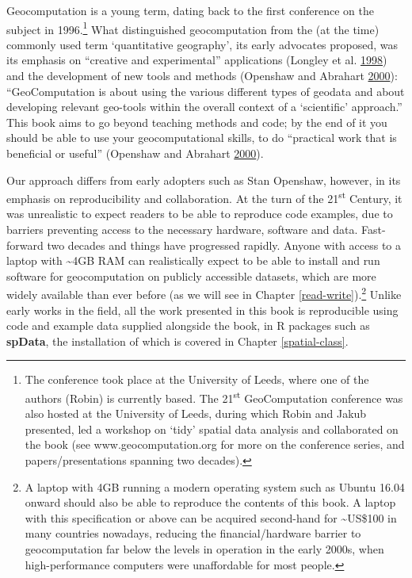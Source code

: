 \documentclass[]{krantz}
\let\rmarkdownfootnote\footnote%
\def\footnote{\protect\rmarkdownfootnote}
\begin{document}
Geocomputation is a young term, dating back to the first conference on the subject in 1996.\footnote{The conference took place at the University of Leeds, where one of the authors (Robin) is currently based.
  The 21\textsuperscript{st} GeoComputation conference was also hosted at the University of Leeds, during which Robin and Jakub presented, led a workshop on `tidy' spatial data analysis and collaborated on the book (see www.geocomputation.org for more on the conference series, and papers/presentations spanning two decades).}
What distinguished geocomputation from the (at the time) commonly used term `quantitative geography', its early advocates proposed, was its emphasis on ``creative and experimental'' applications (Longley et al. \protect\hyperlink{ref-longley_geocomputation_1998}{1998}) and the development of new tools and methods (Openshaw and Abrahart \protect\hyperlink{ref-openshaw_geocomputation_2000}{2000}):
``GeoComputation is about using the various different types of geodata and about developing relevant geo-tools within the overall context of a `scientific' approach.''
This book aims to go beyond teaching methods and code; by the end of it you should be able to use your geocomputational skills, to do ``practical work that is beneficial or useful'' (Openshaw and Abrahart \protect\hyperlink{ref-openshaw_geocomputation_2000}{2000}).

Our approach differs from early adopters such as Stan Openshaw, however, in its emphasis on reproducibility and collaboration.
At the turn of the 21\textsuperscript{st} Century, it was unrealistic to expect readers to be able to reproduce code examples, due to barriers preventing access to the necessary hardware, software and data.
Fast-forward two decades and things have progressed rapidly.
Anyone with access to a laptop with \textasciitilde{}4GB RAM can realistically expect to be able to install and run software for geocomputation on publicly accessible datasets, which are more widely available than ever before (as we will see in Chapter \ref{read-write}).\footnote{A laptop with 4GB running a modern operating system such as Ubuntu 16.04 onward should also be able to reproduce the contents of this book.
  A laptop with this specification or above can be acquired second-hand for \textasciitilde{}US\$100 in many countries nowadays, reducing the financial/hardware barrier to geocomputation far below the levels in operation in the early 2000s, when high-performance computers were unaffordable for most people.}
Unlike early works in the field, all the work presented in this book is reproducible using code and example data supplied alongside the book, in R packages such as \textbf{spData}, the installation of which is covered in Chapter \ref{spatial-class}.
\end{document}
